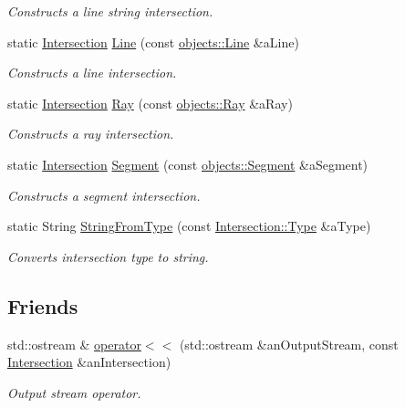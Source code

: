 \begin{DoxyCompactItemize}
\begin{DoxyCompactList}\small\item\em Constructs a line string intersection. \end{DoxyCompactList}\item 
static \hyperlink{classostk_1_1math_1_1geom_1_1d3_1_1_intersection}{Intersection} \hyperlink{classostk_1_1math_1_1geom_1_1d3_1_1_intersection_a651b8385b994ba358e1422c867e94473}{Line} (const \hyperlink{classostk_1_1math_1_1geom_1_1d3_1_1objects_1_1_line}{objects\+::\+Line} \&a\+Line)
\begin{DoxyCompactList}\small\item\em Constructs a line intersection. \end{DoxyCompactList}\item 
static \hyperlink{classostk_1_1math_1_1geom_1_1d3_1_1_intersection}{Intersection} \hyperlink{classostk_1_1math_1_1geom_1_1d3_1_1_intersection_a84c94e62ad40fb0fc94638c807978cf4}{Ray} (const \hyperlink{classostk_1_1math_1_1geom_1_1d3_1_1objects_1_1_ray}{objects\+::\+Ray} \&a\+Ray)
\begin{DoxyCompactList}\small\item\em Constructs a ray intersection. \end{DoxyCompactList}\item 
static \hyperlink{classostk_1_1math_1_1geom_1_1d3_1_1_intersection}{Intersection} \hyperlink{classostk_1_1math_1_1geom_1_1d3_1_1_intersection_a993d41317e731ddc303e716fbc603546}{Segment} (const \hyperlink{classostk_1_1math_1_1geom_1_1d3_1_1objects_1_1_segment}{objects\+::\+Segment} \&a\+Segment)
\begin{DoxyCompactList}\small\item\em Constructs a segment intersection. \end{DoxyCompactList}\item 
static String \hyperlink{classostk_1_1math_1_1geom_1_1d3_1_1_intersection_a13f5a3681c7a0f4892724bdd91247e05}{String\+From\+Type} (const \hyperlink{classostk_1_1math_1_1geom_1_1d3_1_1_intersection_a21196aae3f56795cb11d07afaaaf41c1}{Intersection\+::\+Type} \&a\+Type)
\begin{DoxyCompactList}\small\item\em Converts intersection type to string. \end{DoxyCompactList}\end{DoxyCompactItemize}
\subsection*{Friends}
\begin{DoxyCompactItemize}
\item 
std\+::ostream \& \hyperlink{classostk_1_1math_1_1geom_1_1d3_1_1_intersection_a8ff783039001be6a871338148f4f2919}{operator$<$$<$} (std\+::ostream \&an\+Output\+Stream, const \hyperlink{classostk_1_1math_1_1geom_1_1d3_1_1_intersection}{Intersection} \&an\+Intersection)
\begin{DoxyCompactList}\small\item\em Output stream operator. \end{DoxyCompactList}\end{DoxyCompactItemize}


